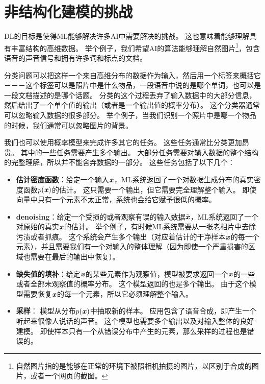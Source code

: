 \section{非结构化建模的挑战}
\label{sec:the_challenge_of_unstructured_modelling}


\gls{DL}的目标是使得\gls{ML}能够解决许多\gls{AI}中需要解决的挑战。
这也意味着能够理解具有丰富结构的高维数据。
举个例子，我们希望\gls{AI}的算法能够理解自然图片\footnote{自然图片指的是能够在正常的环境下被照相机拍摄的图片，以区别于合成的图片，或者一个网页的截图。}，包含语音的声音信号和拥有许多词和标点的文档。


分类问题可以把这样一个来自高维分布的数据作为输入，然后用一个标签来概括它－－－这个标签可以是照片中是什么物品，一段语音中说的是哪个单词，也可以是一段文档描述的是哪个话题。
分类的这个过程丢弃了输入数据中的大部分信息，然后给出了一个单个值的输出（或者是一个输出值的概率分布）。
这个分类器通常可以忽略输入数据的很多部分。
举个例子，当我们识别一个照片中是哪一个物品的时候，我们通常可以忽略图片的背景。


我们也可以使用概率模型来完成许多其它的任务。
这些任务通常比分类更加昂贵。
其中的一些任务需要产生多个输出。
大部分任务需要对输入数据的整个结构的完整理解，所以并不能舍弃数据的一部分。
这些任务包括了以下几个：
\begin{itemize}
	\item \textbf{估计密度函数}：给定一个输入$\boldsymbol{\mathit{x}}$，\gls{ML}系统返回了一个对数据生成分布的真实密度函数$p(\boldsymbol{\mathit{x}})$的估计。
	这只需要一个输出，但它需要完全理解整个输入。
	即使向量中只有一个元素不太正常，系统也会给它赋予很低的概率。
	
	
	\item \textbf{\gls{denoising}}：给定一个受损的或者观察有误的输入数据$\tilde{\boldsymbol{\mathit{x}}}$，\gls{ML}系统返回了一个对原始的真实$\boldsymbol{\mathit{x}}$的估计。
	举个例子，有时候\gls{ML}系统需要从一张老相片中去除污渍或者抓痕。
	这个系统会产生多个输出（对应着估计的干净样本$\boldsymbol{\mathit{x}}$的每一个元素），并且需要我们有一个对输入的整体理解（因为即使一个严重损害的区域也需要在最后的输出中恢复）。
	
	\item \textbf{缺失值的填补}：给定$\boldsymbol{\mathit{x}}$的某些元素作为观察值，模型被要求返回一个$\boldsymbol{\mathit{x}}$的一些或者全部未观察值的概率分布。
	这个模型返回的也是多个输出。
	由于这个模型需要恢复$\boldsymbol{\mathit{x}}$的每一个元素，所以它必须理解整个输入。
	
	\item \textbf{采样}： 模型从分布$p(\boldsymbol{\mathit{x}})$中抽取新的样本。
	应用包含了语音合成，即产生一个听起来很像人说话的声音。
	这个模型也需要多个输出以及对输入整体的良好建模。
	即使样本只有一个从错误分布中产生的元素，那么采样的过程也是错误的。 
\end{itemize}

